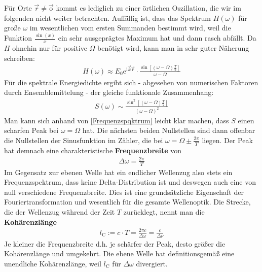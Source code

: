 \documentclass[german,  %
parskip=full,  %
]{scrartcl}
\begin{document}
Für Orte \(\vec{r}\neq \vec{\mathrm{o}}\) kommt es lediglich zu einer örtlichen Oszillation, die wir im folgenden nicht weiter betrachten. Auffällig ist, dass das Spektrum \(H(\omega)\) für große \(\omega\) im wesentlichen vom ersten Summanden bestimmt wird, weil die Funktion \(\frac{\sin(x)}{x}\) ein sehr ausgeprägtes Maximum hat und dann rasch abfällt. Da \(H\) ohnehin nur für positive \(\Omega\) benötigt wird, kann man in sehr guter Näherung schreiben:
\begin{align}
H(\omega) \approx E_0 \mathrm{e}^{\mathrm{i}\vec{k}\vec{r}}\cdot \frac{\sin\left[(\omega - \Omega)\frac{T}{2}\right]}{\omega - \Omega}  
\end{align}
Für die spektrale Energiedichte ergibt sich - abgesehen von numerischen Faktoren durch Ensemblemittelung - der gleiche funktionale Zusammenhang:
\begin{align}
S(\omega) \sim \frac{\sin^2\left[(\omega - \Omega)\frac{T}{2}\right]}{(\omega - \Omega)^2}  
\end{align}
Man kann sich anhand von \ref{Frequenzspqktrum} leicht klar machen, dass \(S\) einen scharfen Peak bei \(\omega=\Omega\) hat. Die nächsten beiden Nullstellen sind dann offenbar die Nullstellen der Sinusfunktion im Zähler, die bei \(\omega = \Omega \pm \frac{2\pi}{T}\) liegen. Der Peak hat demnach eine charakteristische \textbf{Frequenzbreite} von
\begin{align}
\Delta \omega = \frac{2\pi}{T}  
\end{align}
Im Gegensatz zur ebenen Welle hat ein endlicher Wellenzug also stets ein Frequenzspektrum, dass keine Delta-Distribution ist und deswegen auch eine von null verschiedene Frequenzbreite. Dies ist eine grundsätzliche Eigenschaft der Fouriertransformation und wesentlich für die gesamte Wellenoptik. Die Strecke, die der Wellenzug während der Zeit \(T\) zurücklegt, nennt man die \textbf{Kohärenzlänge}
\begin{align}
l_{\mathrm{C}} := c\cdot T = \frac{2\pi c}{\Delta\omega} = \frac{c}{\Delta\nu} 
\end{align}
Je kleiner die Frequenzbreite d.h. je schärfer der Peak, desto größer die Kohärenzlänge und umgekehrt. Die ebene Welle hat definitionsgemäß eine unendliche Kohärenzlänge, weil \(l_{\mathrm{C}}\) für \(\Delta\omega\) divergiert. 
\end{document}
